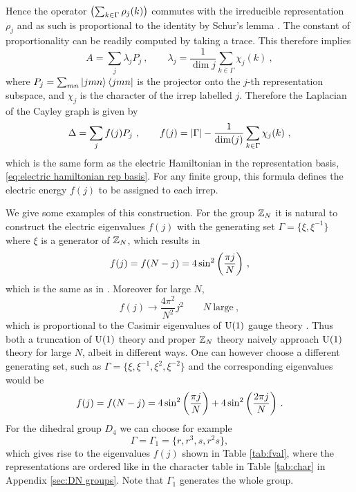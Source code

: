 Hence the operator $\pqty{\sum_{k \in \Gamma} \rho_j(k)}$ commutes with the irreducible representation $\rho_j$ and as such is proportional to the identity by Schur's lemma \cite{serre1967representations}.
The constant of proportionality can be readily computed by taking a trace.
This therefore implies
\begin{equation}
    A = \sum_j \lambda_j P_j \ , \quad \quad \lambda_j = \frac{1}{\dim{j}} \sum_{k \in \Gamma} \chi_j(k) \ ,
\end{equation}
where $P_j = \sum_{mn} \ket{jmn}\bra{jmn}$ is the projector onto the $j$-th representation subspace, and $\chi_j$ is the character of the irrep labelled $j$.
Therefore the Laplacian of the Cayley graph is given by
\begin{equation}\label{eq:laplacian finite group}
    \Delta = \sum_j f(j) P_j \ , \quad \quad f(j)= \abs{\Gamma}-\frac{1}{\mathrm{dim}(j)} \sum_{k \in \Gamma} \chi_j(k) \ ,
\end{equation}
which is the same form as the electric Hamiltonian in the representation basis, \eqref{eq:electric hamiltonian rep basis}. For any finite group, this formula defines the electric energy $f(j)$ to be assigned to each irrep.

\medskip

We give some examples of this construction.
For the group $\mathbb{Z}_N$ it is natural to construct the electric eigenvalues $f(j)$ with the generating set $\Gamma = \{\xi, \xi^{-1}\}$ where $\xi$ is a generator of $\mathbb{Z}_N$, which results in
\begin{equation}
    \label{eq:fj ZN}
    f(j)=f(N-j) = 4\sin^2\pqty{\frac{\pi j}{N}} \ ,
\end{equation}
which is the same as in \cite{notarnicola2015discrete}.
Moreover for large $N$,
\begin{equation}
    f(j) \to \frac{4\pi^2}{N^2} j^2 \qquad N \mathrm{~large} \ ,
\end{equation}
which is proportional to the Casimir eigenvalues of $\mathrm{U}(1)$ gauge theory \cite{notarnicola2015discrete}.
Thus both a truncation of $\mathrm{U}(1)$ theory and proper $\mathbb{Z}_N$ theory naively approach $\mathrm{U}(1)$ theory for large $N$, albeit in different ways.
One can however choose a different generating set, such as $\Gamma = \{\xi, \xi^{-1}, \xi^2, \xi^{-2}\}$ and the corresponding eigenvalues would be
\begin{equation}
    f(j)=f(N-j) = 4\sin^2\pqty{\frac{\pi j}{N}}+4\sin^2\pqty{\frac{2\pi j}{N}} \ .
\end{equation}
For the dihedral group $D_4$ we can choose for example
\begin{equation*}
    \Gamma = \Gamma_1 = \{r,r^3,s,r^2s\},
\end{equation*}
which gives rise to the eigenvalues $f(j)$  shown in Table \ref{tab:fval}, where the representations are ordered like in the character table in Table \ref{tab:char} in Appendix \ref{sec:DN groups}.
Note that $\Gamma_1$ generates the whole group.


